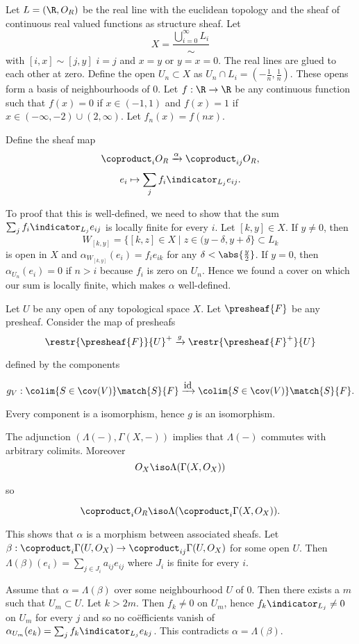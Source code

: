 Let $L = (\R, O_R)$ be the real line with the euclidean topology and the sheaf of continuous real valued functions as structure sheaf.
Let \[X = \frac{\bigcup_{i=0}^\infty L_i}{\sim}\] with $[i,x] \sim [j,y]$ \iff $i=j$ and $x=y$ or $y=x=0$. 
The real lines are glued to each other at zero.
Define the open $U_n\subset X$ as $U_n\cap L_i=(-\frac{1}{n},\frac{1}{n})$. 
These opens form a basis of neighbourhoods of $0$.
Let $f:\R\rightarrow \R$ be any continuous function such that $f(x)=0$ 
if $x\in (-1,1)$ and $f(x)=1$ if $x\in (-\infty,-2)\cup (2,\infty)$.
Let $f_n(x)=f(nx)$.

Define the sheaf map 
\[\coproduct_i O_R \xrightarrow{\alpha} \coproduct_{ij} O_R,\]
\[e_i \mapsto \sum_{j} f_i \indicator_{L_j} e_{ij}.\]

To proof that this is well-defined, we need to show that the sum $\sum_{j} f_i \indicator_{L_j} e_{ij}$ 
is locally finite for every $i$.
Let $[k,y]\in X$. If $y\neq 0$, then \[W_{[k,y]}=\{[k,z]\in X \mid z\in(y-\delta, y+\delta\}\subset L_k\] is open in $X$
and $\alpha_{W_{[k,y]}}(e_i)  = f_ie_{ik}$ for any $\delta< \abs{\frac{y}{2}}$.
If $y=0$, then $\alpha_{U_n}(e_i) = 0$ if $n>i$ because $f_i$ is zero on $U_n$.
Hence we found a cover on which our sum is locally finite, which makes $\alpha$ well-defined.


Let $U$ be any open of any topological space $X$. 
Let $\presheaf{F}$ be any presheaf.
Consider the map of presheafs
\[\restr{\presheaf{F}}{U}^{+}\xrightarrow{g} \restr{\presheaf{F}^{+}}{U}\]

defined by the components

\[g_V: \colim{S\in \cov(V)} \match{S}{F} \xrightarrow{\mbox{id}} \colim{S\in \cov(V)} \match{S}{F}.\]

Every component is a isomorphism, hence $g$ is an isomorphism.

The adjunction $(\Lambda(-),\Gamma(X,-))$ implies that $\Lambda(-)$ commutes with arbitrary colimits.
Moreover
\[O_X \iso \Lambda(\Gamma(X,O_X))\]

so

\[\coproduct_i O_R \iso \Lambda(\coproduct_i \Gamma(X,O_X)).\]

This shows that $\alpha$ is a morphism between associated sheafs.
Let $\beta: \coproduct_i \Gamma(U,O_X)\rightarrow \coproduct_{ij} \Gamma(U,O_X)$ for some open $U$.
Then $\Lambda(\beta)(e_i) = \sum_{j\in J_i} a_{ij} e_{ij}$ where $J_i$ is finite for every $i$.

Assume that $\alpha = \Lambda(\beta)$ over some neighbourhood $U$ of $0$.
Then there exists a $m$ such that $U_m\subset U$. Let $k>2m$.
Then $f_k\neq 0$ on $U_m$, hence $f_k \indicator_{L_j}\neq 0$ on $U_m$ for every $j$ and so no co{\"e}fficients vanish of $\alpha_{U_m}(e_k) =\sum_{j} f_k \indicator_{L_j} e_{kj}$. 
This contradicts $\alpha=\Lambda(\beta)$.